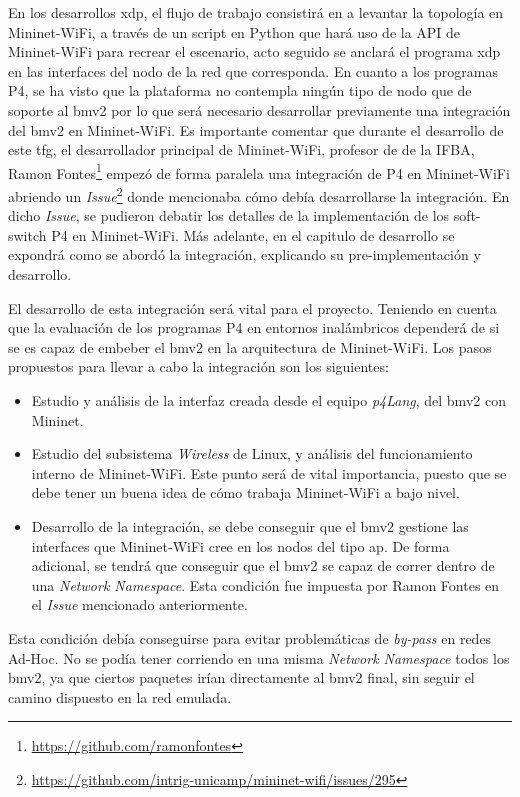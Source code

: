 \par
En los desarrollos \gls{xdp}, el flujo de trabajo consistirá en a levantar la topología en Mininet-WiFi, a través de un script en Python que hará uso de la API de Mininet-WiFi para recrear el escenario, acto seguido se anclará el programa \gls{xdp} en las interfaces del nodo de la red que corresponda. En cuanto a los programas P4, se ha visto que la plataforma no contempla ningún tipo de nodo que de soporte al \gls{bmv2} por lo que será necesario desarrollar previamente una integración del \gls{bmv2} en Mininet-WiFi. Es importante comentar que durante el desarrollo de este \gls{tfg}, el desarrollador principal de Mininet-WiFi, profesor de de la IFBA, Ramon Fontes\footnote{\url{https://github.com/ramonfontes}} empezó de forma paralela una integración de P4 en Mininet-WiFi abriendo un \textit{Issue}\footnote{\url{https://github.com/intrig-unicamp/mininet-wifi/issues/295}} donde mencionaba cómo debía desarrollarse la integración. En dicho \textit{Issue}, se pudieron debatir los detalles de la implementación de los soft-switch P4 en Mininet-WiFi. Más adelante, en el capitulo de desarrollo se expondrá como se abordó la integración, explicando su pre-implementación y desarrollo. \\

\par

El desarrollo de esta integración será vital para el proyecto. Teniendo en cuenta que la evaluación de los programas P4 en entornos inalámbricos dependerá de si se es capaz de embeber el \gls{bmv2} en la arquitectura de Mininet-WiFi. Los pasos propuestos para llevar a cabo la integración son los siguientes:
\vspace{0.5cm}

\begin{itemize}
    \item  Estudio y análisis de la interfaz creada desde el equipo \textit{p4Lang}, del \gls{bmv2} con Mininet.
    \item Estudio del subsistema \textit{Wireless} de Linux, y análisis del funcionamiento interno de Mininet-WiFi. Este punto será de vital importancia, puesto que se debe tener un buena idea de cómo trabaja Mininet-WiFi a bajo nivel.
    \item   Desarrollo de la integración, se debe conseguir que el \gls{bmv2} gestione las interfaces que Mininet-WiFi cree en los nodos del tipo \gls{ap}. De forma adicional, se tendrá que conseguir que el \gls{bmv2} se capaz de correr dentro de una \textit{Network Namespace}. Esta condición fue impuesta por Ramon Fontes en el \textit{Issue} mencionado anteriormente. 
\end{itemize}

Esta condición debía conseguirse para evitar problemáticas de \textit{by-pass} en redes Ad-Hoc. No se podía tener corriendo en una misma \textit{Network Namespace} todos los \gls{bmv2}, ya que ciertos paquetes irían directamente al \gls{bmv2} final, sin seguir el camino dispuesto en la red emulada.\\


